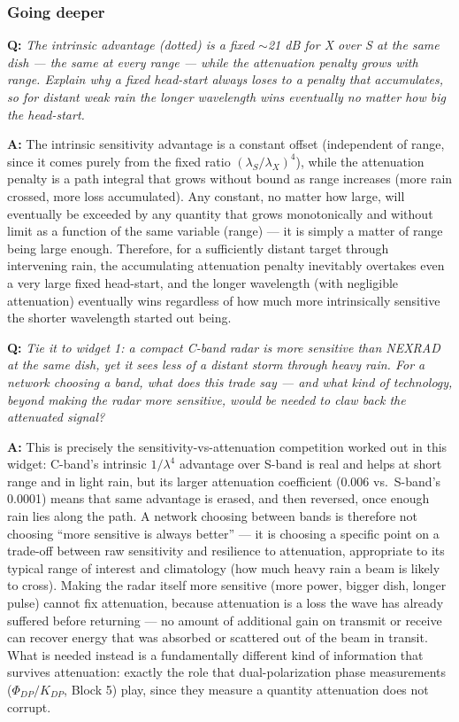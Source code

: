 \documentclass[11pt]{article}
\newenvironment{qa}[1]{\par\noindent\textbf{\color{qgray}Q: }\emph{#1}\par\noindent\textbf{A: }}{\par\vspace{6pt}}
\newcommand{\tier}[1]{\subsubsection*{#1}}
\begin{document}
\tier{Going deeper}
\begin{qa}{The intrinsic advantage (dotted) is a fixed $\sim$21 dB for X over S at the same dish --- the same at every range --- while the attenuation penalty grows \emph{with} range. Explain why a fixed head-start always loses to a penalty that accumulates, so for distant weak rain the longer wavelength wins eventually no matter how big the head-start.}
The intrinsic sensitivity advantage is a constant offset (independent of range, since it comes purely from the fixed ratio $(\lambda_S/\lambda_X)^4$), while the attenuation penalty is a path integral that grows without bound as range increases (more rain crossed, more loss accumulated). Any constant, no matter how large, will eventually be exceeded by any quantity that grows monotonically and without limit as a function of the same variable (range) --- it is simply a matter of range being large enough. Therefore, for a sufficiently distant target through intervening rain, the accumulating attenuation penalty inevitably overtakes even a very large fixed head-start, and the longer wavelength (with negligible attenuation) eventually wins regardless of how much more intrinsically sensitive the shorter wavelength started out being.
\end{qa}
\begin{qa}{Tie it to widget 1: a compact C-band radar is more sensitive than NEXRAD at the same dish, yet it sees \emph{less} of a distant storm through heavy rain. For a network choosing a band, what does this trade say --- and what kind of technology, beyond making the radar more sensitive, would be needed to claw back the attenuated signal?}
This is precisely the sensitivity-vs-attenuation competition worked out in this widget: C-band's intrinsic $1/\lambda^4$ advantage over S-band is real and helps at short range and in light rain, but its larger attenuation coefficient (0.006 vs.\ S-band's 0.0001) means that same advantage is erased, and then reversed, once enough rain lies along the path. A network choosing between bands is therefore not choosing ``more sensitive is always better'' --- it is choosing a specific point on a trade-off between raw sensitivity and resilience to attenuation, appropriate to its typical range of interest and climatology (how much heavy rain a beam is likely to cross). Making the radar itself more sensitive (more power, bigger dish, longer pulse) cannot fix attenuation, because attenuation is a loss the wave has already suffered before returning --- no amount of additional gain on transmit or receive can recover energy that was absorbed or scattered out of the beam in transit. What is needed instead is a fundamentally different kind of information that survives attenuation: exactly the role that dual-polarization phase measurements ($\Phi_{DP}/K_{DP}$, Block 5) play, since they measure a quantity attenuation does not corrupt.
\end{qa}
\end{document}
